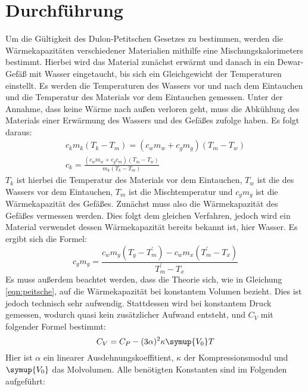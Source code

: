 \section{Durchführung}
\label{sec:Durchführung}
Um die Gültigkeit des Dulon-Petitschen Gesetzes zu bestimmen, werden die Wärmekapazitäten verschiedener Materialien
mithilfe eine Mischungskalorimeters bestimmt.
Hierbei wird das Material zunächst erwärmt und danach in ein Dewar-Gefäß mit Wasser eingetaucht,
bis sich ein Gleichgewicht der Temperaturen einstellt.
Es werden die Temperaturen des Wassers vor und nach dem Eintauchen und die Temperatur des Materials vor dem Eintauchen gemessen.
Unter der Annahme, dass keine Wärme nach außen verloren geht,
muss die Abkühlung des Materials einer Erwärmung des Wassers und des Gefäßes zufolge haben.
Es folgt daraus:
\begin{gather}
    c_km_k(T_k-T_m) = (c_wm_w + c_gm_g)(T_m - T_w) \\
    c_k = \frac{(c_wm_w + c_gc_m)(T_m - T_w)}{m_k(T_k - T_m)}
\end{gather}
$T_k$ ist hierbei die Temperatur des Materials vor dem Eintauchen, $T_w$ ist die des Wassers vor dem Eintauchen,
$T_m$ ist die Mischtemperatur und $c_gm_g$ ist die Wärmekapazität des Gefäßes.
Zunächst muss also die Wärmekapazität des Gefäßes vermessen werden. Dies folgt dem gleichen Verfahren, jedoch wird ein Material verwendet
dessen Wärmekapazität bereits bekannt ist, hier Wasser.
Es ergibt sich die Formel:
\begin{equation}
    \label{eqn:gefaess}
    c_gm_g = \frac{c_wm_y\left(T_y - T^{\prime}_m\right) - c_wm_x\left(T^{\prime}_m - T_x\right)}{T^{\prime}_m - T_x}
\end{equation}
Es muss außerdem beachtet werden, dass die Theorie sich, wie in Gleichung \eqref{eqn:peitsche},
auf die Wärmekapazität bei konstantem Volumen bezieht.
Dies ist jedoch technisch sehr aufwendig. Stattdessen wird bei konstantem Druck gemessen,
wodurch quasi kein zusätzlicher Aufwand entsteht, und $C_V$ mit folgender Formel bestimmt:
\begin{equation}
    C_V = C_P - (3\alpha)^2\kappa\symup{V_0}T
\end{equation}
Hier ist $\alpha$ ein linearer Ausdehnungskoeffitient, $\kappa$ der Kompressionsmodul und $\symup{V_0}$ das Molvolumen.
Alle benötigten Konstanten sind im Folgenden aufgeführt:
